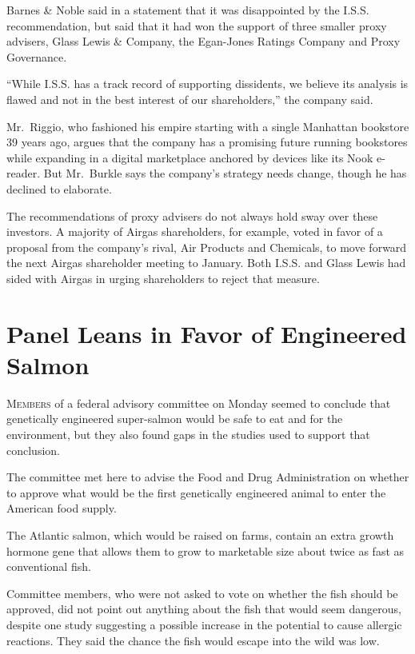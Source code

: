 ﻿\documentclass[12pt]{article}
\begin{document}
Barnes \& Noble said in a statement that it was disappointed by the I.S.S. recommendation, but said
that it had won the support of three smaller proxy advisers, Glass Lewis \& Company, the Egan-Jones
Ratings Company and Proxy Governance.

``While I.S.S. has a track record of supporting dissidents, we believe its analysis is flawed and
not in the best interest of our shareholders,'' the company said.

Mr.~Riggio, who fashioned his empire starting with a single Manhattan bookstore 39 years ago, argues
that the company has a promising future running bookstores while expanding in a digital marketplace
anchored by devices like its Nook e-reader. But Mr.~Burkle says the company's strategy needs change,
though he has declined to elaborate.

The recommendations of proxy advisers do not always hold sway over these investors. A majority of
Airgas shareholders, for example, voted in favor of a proposal from the company's rival, Air
Products and Chemicals, to move forward the next Airgas shareholder meeting to January. Both I.S.S.
and Glass Lewis had sided with Airgas in urging shareholders to reject that measure.

\pagebreak
\section{Panel Leans in Favor of Engineered Salmon}

\lettrine{M}{embers} of a federal advisory committee on Monday seemed to
conclude that genetically engineered super-salmon would be safe to eat and for the environment, but
they also found gaps in the studies used to support that conclusion.

The committee met here to advise the Food and Drug Administration on whether to approve what would
be the first genetically engineered animal to enter the American food supply.

The Atlantic salmon, which would be raised on farms, contain an extra growth hormone gene that
allows them to grow to marketable size about twice as fast as conventional fish.

Committee members, who were not asked to vote on whether the fish should be approved, did not point
out anything about the fish that would seem dangerous, despite one study suggesting a possible
increase in the potential to cause allergic reactions. They said the chance the fish would escape
into the wild was low.
\end{document}
